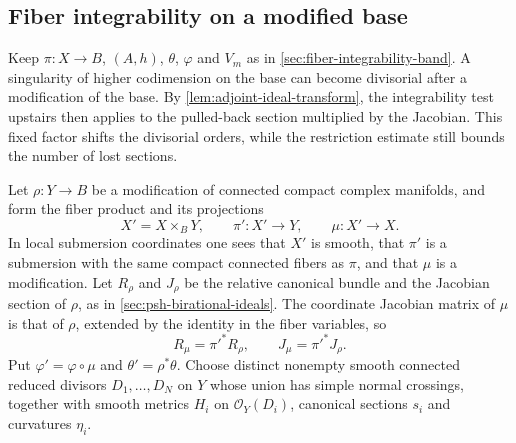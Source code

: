 \subsection{Fiber integrability on a modified base}
\label{sec:modified-base-fiber-integrability}

Keep $\pi\colon X\to B$, $(A,h)$, $\theta$, $\varphi$ and $V_m$ as in \cref{sec:fiber-integrability-band}. A singularity of higher codimension on the base can become divisorial after a modification of the base. By \cref{lem:adjoint-ideal-transform}, the integrability test upstairs then applies to the pulled-back section multiplied by the Jacobian. This fixed factor shifts the divisorial orders, while the restriction estimate still bounds the number of lost sections.

Let $\rho\colon Y\to B$ be a modification of connected compact complex manifolds, and form the fiber product and its projections
\[
 X'=X\times_B Y,\qquad \pi'\colon X'\to Y,\qquad \mu\colon X'\to X.
\]
In local submersion coordinates one sees that $X'$ is smooth, that $\pi'$ is a submersion with the same compact connected fibers as $\pi$, and that $\mu$ is a modification. Let $R_\rho$ and $J_\rho$ be the relative canonical bundle and the Jacobian section of $\rho$, as in \cref{sec:psh-birational-ideals}. The coordinate Jacobian matrix of $\mu$ is that of $\rho$, extended by the identity in the fiber variables, so
\[
 R_\mu=\pi'^*R_\rho,\qquad J_\mu=\pi'^*J_\rho.
\]
Put $\varphi'=\varphi\circ\mu$ and $\theta'=\rho^*\theta$. Choose distinct nonempty smooth connected reduced divisors $D_1,\ldots,D_N$ on $Y$ whose union has simple normal crossings, together with smooth metrics $H_i$ on $\mathcal O_Y(D_i)$, canonical sections $s_i$ and curvatures $\eta_i$.

